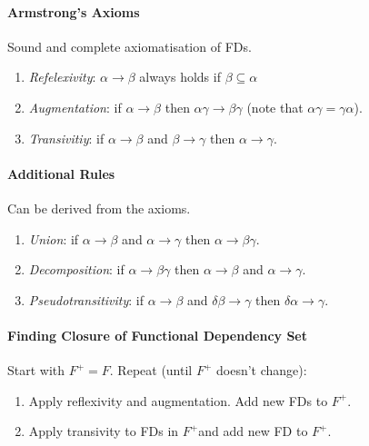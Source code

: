 \documentclass[twocolumn,english]{article}
\begin{document}
\paragraph{Armstrong's Axioms}

Sound and complete axiomatisation of FDs.
\begin{enumerate}
\item \emph{Refelexivity}: $\alpha\rightarrow\beta$ always holds if $\beta\subseteq\alpha$
\item \emph{Augmentation}: if $\alpha\rightarrow\beta$ then $\alpha\gamma\rightarrow\beta\gamma$
(note that $\alpha\gamma=\gamma\alpha$).
\item \emph{Transivitiy}: if $\alpha\rightarrow\beta$ and $\beta\rightarrow\gamma$
then $\alpha\rightarrow\gamma$.
\end{enumerate}

\paragraph{Additional Rules}

Can be derived from the axioms.
\begin{enumerate}
\item \emph{Union}: if $\alpha\rightarrow\beta$ and $\alpha\rightarrow\gamma$
then $\alpha\rightarrow\beta\gamma$.
\item \emph{Decomposition}: if $\alpha\rightarrow\beta\gamma$ then $\alpha\rightarrow\beta$
and $\alpha\rightarrow\gamma$.
\item \emph{Pseudotransitivity}: if $\alpha\rightarrow\beta$ and $\delta\beta\rightarrow\gamma$
then $\delta\alpha\rightarrow\gamma$.
\end{enumerate}

\paragraph{Finding Closure of Functional Dependency Set}

Start with $F^{+}=F$. Repeat (until $F^{+}$ doesn't change):
\begin{enumerate}
\item Apply reflexivity and augmentation. Add new FDs to $F^{+}$.
\item Apply transivity to FDs in $F^{+}$and add new FD to $F^{+}$.
\end{enumerate}
\end{document}
